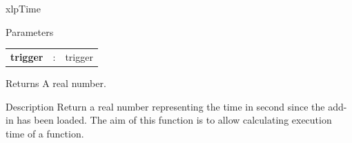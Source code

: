 \begin{xlpfunctitle}{xlpTime}

\begin{xlpfunc}{Parameters}
\begin{tabular}{p{3.5cm}cl}
\textbf{trigger}& : & trigger 
\end{tabular}
\end{xlpfunc}


\begin{xlpfunc}{Returns}
A real number.
\end{xlpfunc}

\begin{xlpfunc}{Description}
Return a real number representing the time in second since the add-in has been loaded. 
The aim of this function is to allow calculating execution time of a function.
\end{xlpfunc}
\end{xlpfunctitle}

